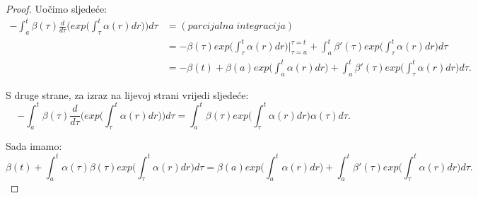 \documentclass[a4paper,oneside,12pt]{memoir} %
\begin{document}
\begin{proof}
Uočimo sljedeće:
\begin{align*}
- \int_a^t \beta(\tau) \frac{d}{d\tau} \Big( exp\Big( \int_{\tau}^t \alpha(r) dr \Big) \Big) d\tau &= (parcijalna \; integracija) \\
&= - \beta(\tau) exp\Big( \int_{\tau}^t \alpha(r) dr \Big) \Big|_{\tau=a}^{\tau=t} + \int_a^t \beta'(\tau) exp\Big( \int_{\tau}^t \alpha(r) dr \Big) d\tau \\
&= - \beta(t) + \beta(a) exp\Big( \int_a^t \alpha(r) dr \Big) + \int_a^t \beta'(\tau) exp\Big( \int_{\tau}^t \alpha(r) dr \Big) d\tau.
\end{align*}

S druge strane, za izraz na lijevoj strani vrijedi sljedeće:
\begin{equation*}
- \int_a^t \beta(\tau) \frac{d}{d\tau} \Big( exp\Big( \int_{\tau}^t \alpha(r) dr \Big) \Big) d\tau = \int_a^t \beta(\tau) exp \Big( \int_{\tau}^t \alpha(r) dr \Big) \alpha(\tau) d\tau.
\end{equation*}

Sada imamo:
\begin{equation*}
\beta(t) + \int_a^t \alpha(\tau) \beta(\tau) exp \Big( \int_{\tau}^t \alpha(r) dr \Big) d\tau = \beta(a) exp\Big( \int_a^t \alpha(r) dr \Big) + \int_a^t \beta'(\tau) exp\Big( \int_{\tau}^t \alpha(r) dr \Big) d\tau.
\end{equation*}


\end{proof}
\end{document}
